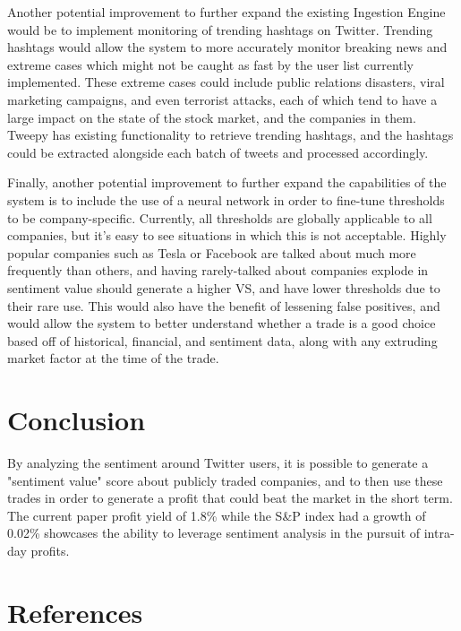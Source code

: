 \documentclass[11pt]{article}
\begin{document}
Another potential improvement to further expand the existing
Ingestion Engine would be to implement monitoring of
trending hashtags on Twitter. Trending hashtags would
allow the system to more accurately monitor breaking
news and extreme cases which might not be caught as
fast by the user list currently implemented. These
extreme cases could include public relations disasters,
viral marketing campaigns, and even terrorist attacks,
each of which tend to have a large impact on the state
of the stock market, and the companies in them. Tweepy
has existing functionality to retrieve trending hashtags,
and the hashtags could be extracted alongside each batch
of tweets and processed accordingly.

Finally, another potential improvement to further expand the
capabilities of the system is to include the use of a neural
network in order to fine-tune thresholds to be company-specific.
Currently, all thresholds are globally applicable to all companies,
but it's easy to see situations in which this is not acceptable.
Highly popular companies such as Tesla or Facebook are talked about
much more frequently than others, and having rarely-talked about
companies explode in sentiment value should generate a higher VS,
and have lower thresholds due to their rare use. This would also
have the benefit of lessening false positives, and would allow the
system to better understand whether a trade is a good choice based
off of historical, financial, and sentiment data, along with any
extruding market factor at the time of the trade.

\section{Conclusion}
By analyzing the sentiment around Twitter users,
it is possible to generate a "sentiment value" score
about publicly traded companies, and to then use these
trades in order to generate a profit that could beat
the market in the short term. The current paper profit
yield of 1.8\% while the S\&P index had a growth
of 0.02\% showcases the ability to leverage sentiment
analysis in the pursuit of intra-day profits.

\newpage
\section{References}
{}

\end{document}
